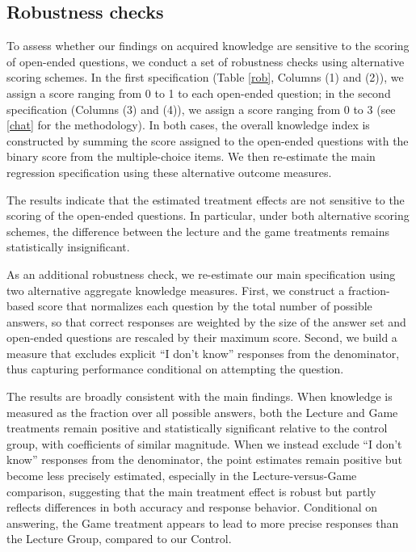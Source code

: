\documentclass[preprint,12pt]{elsarticle}
\begin{document}
\subsection{Robustness checks}
To assess whether our findings on acquired knowledge are sensitive to the scoring of open-ended questions, we conduct a set of robustness checks using alternative scoring schemes. In the first specification (Table \ref{rob}, Columns (1) and (2)), we assign a score ranging from 0 to 1 to each open-ended question; in the second specification (Columns (3) and (4)), we assign a score ranging from 0 to 3 (see \ref{chat} for the methodology). In both cases, the overall knowledge index is constructed by summing the score assigned to the open-ended questions with the binary score from the multiple-choice items.
We then re-estimate the main regression specification using these alternative outcome measures.



The results indicate that the estimated treatment effects are not sensitive to the scoring of the open-ended questions. In particular, under both alternative scoring schemes, the difference between the lecture and the game treatments remains statistically insignificant.



As an additional robustness check, we re-estimate our main specification using two alternative aggregate knowledge measures. First, we construct a fraction-based score that normalizes each question by the total number of possible answers, so that correct responses are weighted by the size of the answer set and open-ended questions are rescaled by their maximum score. Second, we build a measure that excludes explicit “I don’t know” responses from the denominator, thus capturing performance conditional on attempting the question.

The results are broadly consistent with the main findings. When knowledge is measured as the fraction over all possible answers, both the Lecture and Game treatments remain positive and statistically significant relative to the control group, with coefficients of similar magnitude. When we instead exclude “I don’t know” responses from the denominator, the point estimates remain positive but become less precisely estimated, especially in the Lecture-versus-Game comparison, suggesting that the main treatment effect is robust but partly reflects differences in both accuracy and response behavior. Conditional on answering, the Game treatment appears to lead to more precise responses than the Lecture Group, compared to our Control.
\end{document}
